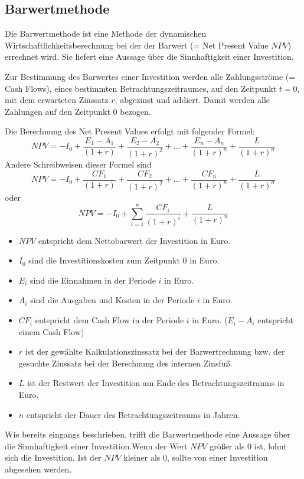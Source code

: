 \documentclass[a4paper,12pt]{article}
\begin{document}
	\subsection{Barwertmethode}
	\label{sec:BerechnungenBarwertmethode}
	Die Barwertmethode ist eine Methode der dynamischen Wirtschaftlichkeitsberechnung bei der der Barwert (= Net Present Value $NPV$) errechnet wird. Sie liefert eine Aussage über die Sinnhaftigkeit einer Investition.\\ \par
	\noindent Zur Bestimmung des Barwertes einer Investition werden alle Zahlungsströme (= Cash Flows), eines bestimmten Betrachtungszeitraumes, auf den Zeitpunkt $t=0$, mit dem erwarteten Zinssatz $r$, abgezinst und addiert. Damit werden alle Zahlungen auf den Zeitpunkt $0$ bezogen.\\ \par
	\noindent Die Berechnung des Net Present Values erfolgt mit folgender Formel:
	\begin{equation}
	NPV=-I_0+\frac{E_1-A_1}{(1+r)}+\frac{E_2-A_2}{(1+r)^2}+...+\frac{E_n-A_n}{(1+r)^n}+\frac{L}{(1+r)^n}
	\end{equation}
	Andere Schreibweisen dieser Formel sind
	\begin{equation}
	NPV=-I_0+\frac{CF_1}{(1+r)}+\frac{CF_2}{(1+r)^2}+...+\frac{CF_n}{(1+r)^n}+\frac{L}{(1+r)^n}
	\end{equation}
	oder
	\begin{equation}
	NPV=-I_0+\sum_{i=1}^n\frac{CF_i}{(1+r)^i}+\frac{L}{(1+r)^n}
	\end{equation}
	\begin{itemize}
		\item $NPV$ entspricht dem Nettobarwert der Investition in Euro.
		\item $I_0$ sind die Investitionskosten zum Zeitpunkt $0$ in Euro.
		\item $E_i$ sind die Einnahmen in der Periode $i$ in Euro.
		\item $A_i$ sind die Ausgaben und Kosten in der Periode $i$ in Euro.
		\item $CF_i$ entspricht dem Cash Flow in der Periode $i$ in Euro. ($E_i-A_i$ entspricht einem Cash Flow)
		\item $r$ ist der gewählte Kalkulationszinssatz bei der Barwertrechnung bzw. der gesuchte Zinssatz bei der Berechnung des internen Zinsfuß.
		\item $L$ ist der Restwert der Investition am Ende des Betrachtungszeitraums in Euro.
		\item $n$ entspricht der Dauer des Betrachtungszeitraums in Jahren.
	\end{itemize}
	Wie bereits eingangs beschrieben, trifft die Barwertmethode eine Aussage über die Sinnhaftigkeit einer Investition.\newline Wenn der Wert $NPV$ größer als $0$ ist, lohnt sich die Investition. Ist der $NPV$ kleiner als $0$, sollte von einer Investition abgesehen werden.
\end{document}
